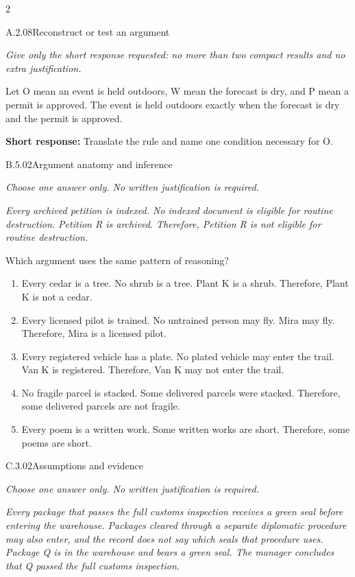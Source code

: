 \documentclass[9pt]{extarticle}
\newcommand{\choice}[1]{\item #1}
\begin{document}
\CoreWorkArea
\FormBreak
{}
\begin{multicols}{2}
\begin{DenseCoreProblem}{A.2.08}{Reconstruct or test an argument}
{\scriptsize\textit{Give only the short response requested: no more than two compact results and no extra justification.}\par}
Let O mean an event is held outdoors, W mean the forecast is dry, and P mean a permit is approved. The event is held outdoors exactly when the forecast is dry and the permit is approved.

\textbf{Short response:} Translate the rule and name one condition necessary for O.
\end{DenseCoreProblem}
\begin{DenseCoreProblem}{B.5.02}{Argument anatomy and inference}
{\scriptsize\textit{Choose one answer only. No written justification is required.}\par}
\emph{Every archived petition is indexed. No indexed document is eligible for routine destruction. Petition R is archived. Therefore, Petition R is not eligible for routine destruction.}

Which argument uses the same pattern of reasoning?
\begin{enumerate}[label=(\alph*)]
  \choice{Every cedar is a tree. No shrub is a tree. Plant K is a shrub. Therefore, Plant K is not a cedar.}
  \choice{Every licensed pilot is trained. No untrained person may fly. Mira may fly. Therefore, Mira is a licensed pilot.}
  \choice{Every registered vehicle has a plate. No plated vehicle may enter the trail. Van K is registered. Therefore, Van K may not enter the trail.}
  \choice{No fragile parcel is stacked. Some delivered parcels were stacked. Therefore, some delivered parcels are not fragile.}
  \choice{Every poem is a written work. Some written works are short. Therefore, some poems are short.}
\end{enumerate}
\end{DenseCoreProblem}
\columnbreak
\begin{DenseCoreProblem}{C.3.02}{Assumptions and evidence}
{\scriptsize\textit{Choose one answer only. No written justification is required.}\par}
\emph{Every package that passes the full customs inspection receives a green seal before entering the warehouse. Packages cleared through a separate diplomatic procedure may also enter, and the record does not say which seals that procedure uses. Package Q is in the warehouse and bears a green seal. The manager concludes that Q passed the full customs inspection.}


\end{DenseCoreProblem}
\end{multicols}
\end{document}
